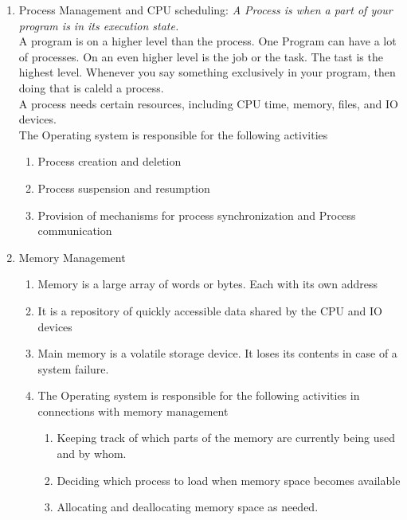 \documentclass[11pt]{article}
\begin{document}
\begin{enumerate}
	\item Process Management and CPU scheduling:
	      \textit{A Process is when a part of your program is in its execution state.}\\
	      A program is on a higher level than the process. One Program can have a lot of processes. On an even higher level is the job or the task. The tast is the highest level. Whenever you say something exclusively in your program, then doing that is caleld a process. \\

	      A process needs certain resources, including CPU time, memory, files, and IO devices. \\

	      The Operating system is responsible for the following activities
	      \begin{enumerate}
		      \item Process creation and deletion
		      \item Process suspension and resumption
		      \item Provision of mechanisms for process synchronization  and Process communication
	      \end{enumerate}

	\item Memory Management
	      \begin{enumerate}
		      \item Memory is a large array of words or bytes. Each with its own address
		      \item It is a repository of quickly accessible data shared by the CPU and IO devices
		      \item Main memory is a volatile storage device. It loses its contents in case of a system failure.
		      \item The Operating system is responsible for the following activities in connections with memory management
		            \begin{enumerate}
			            \item Keeping track of which parts of the memory are currently being used and by whom.
			            \item Deciding which process to load when memory space becomes available
			            \item Allocating and deallocating memory space as needed.
		            \end{enumerate}



\end{enumerate}
\end{enumerate}
\end{document}
